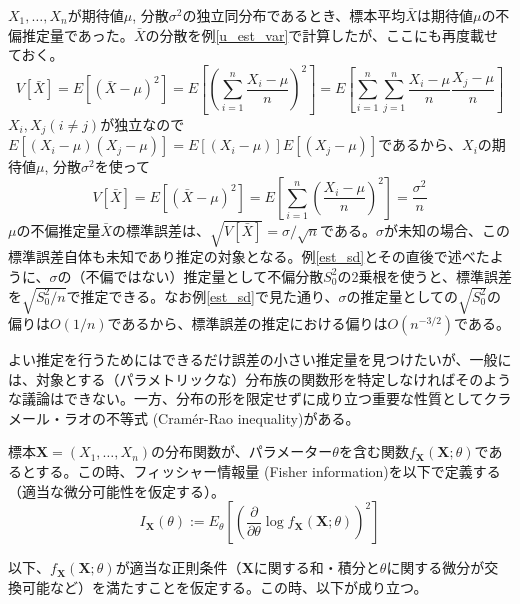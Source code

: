 \documentclass[uplatex,dvipdfmx]{jlreq}
\newcommand\term[1]{\textsf{#1}}
\begin{document}
\begin{example}
    $X_1, \dotsc, X_n$が期待値$\mu$, 分散$\sigma^2$の独立同分布であるとき、標本平均$\bar{X}$は期待値$\mu$の不偏推定量であった。$\bar{X}$の分散を例\ref{u_est_var}で計算したが、ここにも再度載せておく。
    \begin{equation}
        V[\bar{X}] = E[(\bar{X} - \mu)^2]
        = E\left[\left(\sum_{i=1}^n\frac{X_i - \mu}{n}\right)^2\right]
        = E\left[\sum_{i=1}^n\sum_{j=1}^n\frac{X_i - \mu}{n}\frac{X_j - \mu}{n}\right]
    \end{equation}
    $X_i, X_j (i \neq j)$が独立なので$E[(X_i-\mu)(X_j-\mu)] = E[(X_i-\mu)]E[(X_j-\mu)]$であるから、$X_i$の期待値$\mu$, 分散$\sigma^2$を使って
    \begin{equation}
        V[\bar{X}] = E[(\bar{X} - \mu)^2]
        = E\left[\sum_{i=1}^n\left(\frac{X_i - \mu}{n}\right)^2\right]
        = \frac{\sigma^2}{n}
    \end{equation}
    $\mu$の不偏推定量$\bar{X}$の標準誤差は、$\sqrt{V[\bar{X}]}=\sigma/\sqrt{n}$である。$\sigma$が未知の場合、この標準誤差自体も未知であり推定の対象となる。例\ref{est_sd}とその直後で述べたように、$\sigma$の（不偏ではない）推定量として不偏分散$S_0^2$の2乗根を使うと、標準誤差を$\sqrt{S_0^2/n}$で推定できる。なお例\ref{est_sd}で見た通り、$\sigma$の推定量としての$\sqrt{S_0^2}$の偏りは$O(1/n)$であるから、標準誤差の推定における偏りは$O(n^{-3/2})$である。
\end{example}

よい推定を行うためにはできるだけ誤差の小さい推定量を見つけたいが、一般には、対象とする（パラメトリックな）分布族の関数形を特定しなければそのような議論はできない。一方、分布の形を限定せずに成り立つ重要な性質として\term{クラメール・ラオの不等式 (Cram\'{e}r-Rao inequality)}がある。

標本$\boldsymbol{X} = (X_1, \dotsc, X_n)$の分布関数が、パラメーター$\theta$を含む関数$f_{\boldsymbol{X}}(\boldsymbol{X}; \theta)$であるとする。この時、\term{フィッシャー情報量 (Fisher information)}を以下で定義する（適当な微分可能性を仮定する）。
\begin{equation}
    I_{\boldsymbol{X}}(\theta) := E_\theta\left[
        \left(
            \frac{\partial}{\partial \theta}
            \log f_{\boldsymbol{X}}(\boldsymbol{X}; \theta)
        \right)^2
    \right]
\end{equation}

以下、$f_{\boldsymbol{X}}(\boldsymbol{X}; \theta)$が適当な正則条件（$\boldsymbol{X}$に関する和・積分と$\theta$に関する微分が交換可能など）を満たすことを仮定する。この時、以下が成り立つ。
\end{document}
